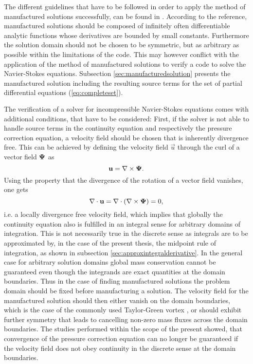 The different guidelines that have to be followed in order to apply the method of manufactured solutions successfully, can be found in \cite{salari00}. According to the reference, manufactured solutions should be composed of infinitely often differentiable analytic functions whose derivatives are bounded by small constants. Furthermore the solution domain should not be chosen to be symmetric, but as arbitrary as possible within the limitations of the code. This may however conflict with the application of the method of manufactured solutions to verify a code to solve the Navier-Stokes equations. Subsection \ref{sec:manufacturedsolution} presents the manufactured solution including the resulting source terms for the set of partial differential equations (\ref{eq:completeset}).

The verification of a solver for incompressible Navier-Stokes equations comes with additional conditions, that have to be considered: First, if the solver is not able to handle source terms in the continuity equation and respectively the pressure correction equation, a velocity field should be chosen that is inherently divergence free. This can be achieved by defining the velocity field \(\vec{u}\) through the curl of a vector field \(\boldsymbol{\Psi}\) as
\begin{displaymath}
  \mathbf{u} = \nabla \times \boldsymbol{\Psi}.
\end{displaymath}
Using the property that the divergence of the rotation of a vector field vanishes, one gets
\begin{displaymath}
  \nabla \cdot \mathbf{u} = \nabla \cdot \left( \nabla \times \boldsymbol{\Psi}\right) = 0,
\end{displaymath}
i.e. a locally divergence free velocity field, which implies that globally the continuity equation also is fulfilled in an integral sense for arbitrary domains of integration. This is not necessarily true in the discrete sense as integrals are to be approximated by, in the case of the present thesis, the midpoint rule of integration, as shown in subsection \ref{sec:approxintegralderivative}. In the general case for arbitrary solution domains global mass conservation cannot be guaranteed even though the integrands are exact quantities at the domain boundaries. Thus in the case of finding manufactured solutions the problem domain should be fixed before manufacturing a solution. The velocity field for the manufactured solution should then either vanish on the domain boundaries, which is the case of the commonly used Taylor-Green vortex \cite{taylor37}, or should exhibit further symmetry that leads to cancelling non-zero mass fluxes across the domain boundaries. The studies performed within the scope of the present showed, that convergence of the pressure correction equation can no longer be guaranteed if the velocity field does not obey continuity in the discrete sense at the domain boundaries.

